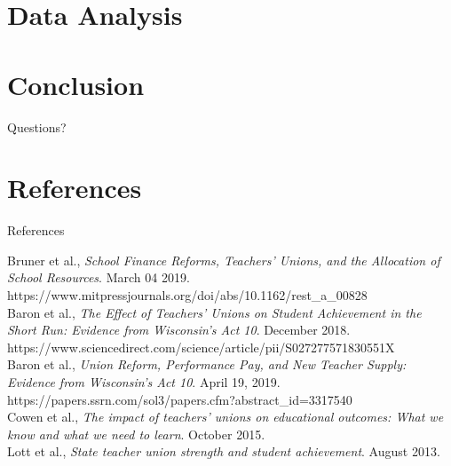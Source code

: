 \documentclass[12pt,aspectratio=169]{beamer} %
\begin{document}
\section{Data Analysis}

\section{Conclusion}


{\BackgroundShaded
\begin{frame}
Questions?
\end{frame}
}



\section{References}

\begin{frame}{References}

	Bruner et al., \emph{School Finance Reforms, Teachers' Unions, and the Allocation of School Resources}. March 04 2019. https://www.mitpressjournals.org/doi/abs/10.1162/rest\_a\_00828
	\\
	
	Baron et al., \emph{The Effect of Teachers’ Unions on Student Achievement in the Short Run: Evidence from Wisconsin’s Act 10}. December 2018. https://www.sciencedirect.com/science/article/pii/S027277571830551X
	\\
	
	Baron et al., \emph{Union Reform, Performance Pay, and New Teacher Supply: Evidence from Wisconsin's Act 10}. April 19, 2019. https://papers.ssrn.com/sol3/papers.cfm?abstract\_id=3317540
	\\
	
	Cowen et al., \emph{The impact of teachers’ unions on educational outcomes: What we know and what we need to learn}. October 2015.
	\\
	
	Lott et al., \emph{State teacher union strength and student achievement}. August 2013.

\end{frame}



\end{document}
